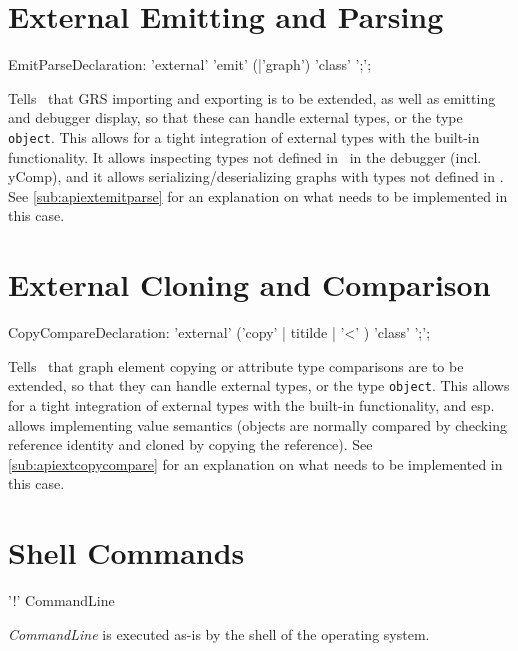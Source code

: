 \section{External Emitting and Parsing}\label{sub:extemitparse}
\begin{rail}
  EmitParseDeclaration: 'external' 'emit' (|'graph') 'class' ';';
\end{rail}
Tells \GrG~that GRS importing and exporting is to be extended, as well as emitting and debugger display, so that these can handle external types, or the type \texttt{object}.
This allows for a tight integration of external types with the built-in functionality.
It allows inspecting types not defined in \GrG~in the debugger (incl. yComp),
and it allows serializing/deserializing graphs with types not defined in \GrG.
See \ref{sub:apiextemitparse} for an explanation on what needs to be implemented in this case.

\section{External Cloning and Comparison}\label{sub:extcopycompare}
\begin{rail}
  CopyCompareDeclaration: 'external' ('copy' | titilde | '<' ) 'class' ';';
\end{rail}
Tells \GrG~that graph element copying or attribute type comparisons are to be extended, so that they can handle external types, or the type \texttt{object}.
This allows for a tight integration of external types with the built-in functionality, 
and esp. allows implementing value semantics (objects are normally compared by checking reference identity and cloned by copying the reference).
See \ref{sub:apiextcopycompare} for an explanation on what needs to be implemented in this case.

\section{Shell Commands}

\begin{rail}
  '!' CommandLine
\end{rail}
\emph{CommandLine} is executed as-is by the shell of the operating system.

